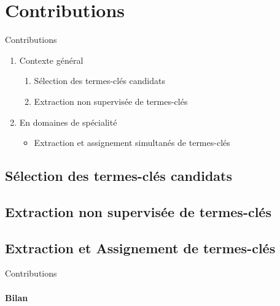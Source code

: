 \section{Contributions}
  \begin{frame}{Contributions}
    \begin{enumerate}
      \item<+->{Contexte général}
      \begin{enumerate}
        \item<+->{Sélection des termes-clés candidats}
        \item<+->{Extraction non supervisée de termes-clés}
      \end{enumerate}
      \item<+->{En domaines de spécialité}
      \begin{itemize}
        \item<+->{Extraction et assignement simultanés de termes-clés}
      \end{itemize}
    \end{enumerate}
  \end{frame}

  \subsection{Sélection des termes-clés candidats}
    

  \subsection{Extraction non supervisée de termes-clés}
    

  \subsection{Extraction et Assignement de termes-clés}
    

  \begin{frame}{Contributions}\framesubtitle{Bilan}
  \end{frame}

